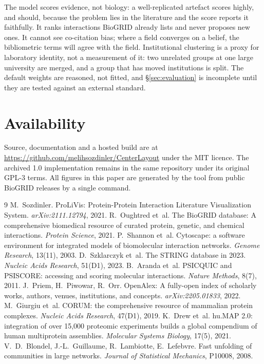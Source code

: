 \documentclass[conference]{IEEEtran}
\begin{document}
The model scores evidence, not biology: a well-replicated artefact scores highly, and
should, because the problem lies in the literature and the score reports it faithfully.
It ranks interactions BioGRID already lists and never proposes new ones. It cannot see
co-citation bias; where a field converges on a belief, the bibliometric terms will
agree with the field. Institutional clustering is a proxy for laboratory identity, not
a measurement of it: two unrelated groups at one large university are merged, and a
group that has moved institutions is split. The default weights are reasoned, not
fitted, and \S\ref{sec:evaluation} is incomplete until they are tested against an
external standard.

\section{Availability}

Source, documentation and a hosted build are at
\url{https://github.com/melihsozdinler/CenterLayout} under the MIT licence. The
archived 1.0 implementation remains in the same repository under its original GPL-3
terms. All figures in this paper are generated by the tool from public BioGRID releases
by a single command.

\begin{thebibliography}{9}
 M.~Sozdinler. ProLiVis: Protein-Protein Interaction Literature
Visualization System. \emph{arXiv:2111.12794}, 2021.
 R.~Oughtred et~al. The BioGRID database: A comprehensive biomedical
resource of curated protein, genetic, and chemical interactions. \emph{Protein Science},
2021.
 P.~Shannon et~al. Cytoscape: a software environment for integrated
models of biomolecular interaction networks. \emph{Genome Research}, 13(11), 2003.
 D.~Szklarczyk et~al. The STRING database in 2023. \emph{Nucleic Acids
Research}, 51(D1), 2023.
 B.~Aranda et~al. PSICQUIC and PSISCORE: accessing and scoring
molecular interactions. \emph{Nature Methods}, 8(7), 2011.
 J.~Priem, H.~Piwowar, R.~Orr. OpenAlex: A fully-open index of
scholarly works, authors, venues, institutions, and concepts. \emph{arXiv:2205.01833},
2022.
 M.~Giurgiu et~al. CORUM: the comprehensive resource of mammalian protein
complexes. \emph{Nucleic Acids Research}, 47(D1), 2019.
 K.~Drew et~al. hu.MAP 2.0: integration of over 15,000 proteomic
experiments builds a global compendium of human multiprotein assemblies.
\emph{Molecular Systems Biology}, 17(5), 2021.
 V.~D.~Blondel, J.-L.~Guillaume, R.~Lambiotte, E.~Lefebvre. Fast
unfolding of communities in large networks. \emph{Journal of Statistical Mechanics},
P10008, 2008.
\end{thebibliography}
\end{document}
